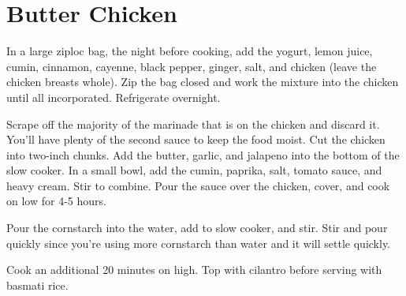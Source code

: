 \section{Butter Chicken}
\begin{recipe}



In a large ziploc bag, the night before cooking, add the yogurt, lemon juice, cumin, cinnamon, cayenne, black pepper, ginger, salt, and chicken (leave the chicken breasts whole). Zip the bag closed and work the mixture into the chicken until all incorporated. Refrigerate overnight.




Scrape off the majority of the marinade that is on the chicken and discard it. You'll have plenty of the second sauce to keep the food moist. Cut the chicken into two-inch chunks. Add the butter, garlic, and jalapeno into the bottom of the slow cooker. In a small bowl, add the cumin, paprika, salt, tomato sauce, and heavy cream. Stir to combine. Pour the sauce over the chicken, cover, and cook on low for 4-5 hours.

Pour the cornstarch into the water, add to slow cooker, and stir. Stir and pour quickly since you're using more cornstarch than water and it will settle quickly.

Cook an additional 20 minutes on high. Top with cilantro before serving with basmati rice.
	
\end{recipe}
